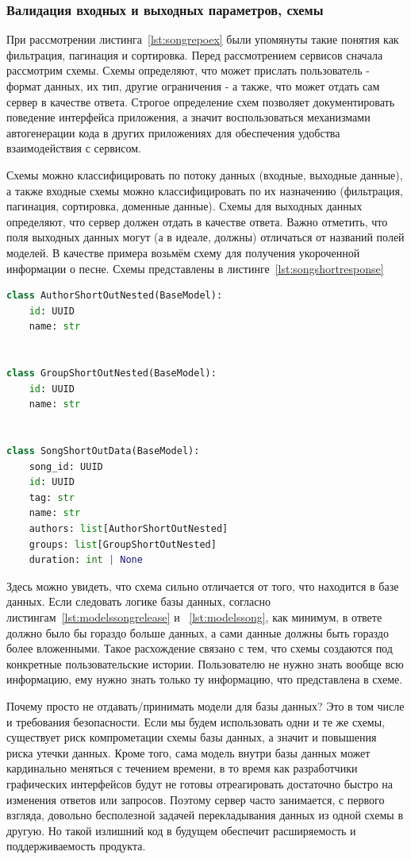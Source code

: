 \documentclass[14pt]{extarticle}
\begin{document}
\subsubsection{Валидация входных и выходных параметров, схемы}

При рассмотрении листинга~\ref{lst:songrepoex} были упомянуты такие понятия как фильтрация, пагинация и сортировка. Перед рассмотрением
сервисов сначала рассмотрим схемы. Схемы определяют, что может прислать пользователь - формат данных, их тип, другие ограничения - а также, 
что может отдать сам сервер в качестве ответа. Строгое определение схем позволяет документировать поведение интерфейса приложения, а значит 
воспользоваться механизмами автогенерации кода в других приложениях для обеспечения удобства взаимодействия с сервисом. 

Схемы можно классифицировать по потоку данных (входные, выходные данные), а также входные схемы можно классифицировать по их назначению (фильтрация, 
пагинация, сортировка, доменные данные). Схемы для выходных данных определяют, что сервер должен отдать в качестве ответа. Важно отметить, что поля выходных 
данных могут (а в идеале, должны) отличаться от названий полей моделей. В качестве примера возьмём схему для получения укороченной информации о песне. Схемы представлены
в листинге~\ref{lst:songshortresponse}
\begin{lstlisting}[caption={Схемы для получения укороченной информации о песне}, label={lst:songshortresponse}, language=Python]
class AuthorShortOutNested(BaseModel):
    id: UUID
    name: str


class GroupShortOutNested(BaseModel):
    id: UUID
    name: str


class SongShortOutData(BaseModel):
    song_id: UUID
    id: UUID
    tag: str
    name: str
    authors: list[AuthorShortOutNested]
    groups: list[GroupShortOutNested]
    duration: int | None
\end{lstlisting}

Здесь можно увидеть, что схема сильно отличается от того, что находится в базе данных. Если следовать логике базы данных, согласно листингам~\ref{lst:modelssongrelease} и ~\ref{lst:modelssong}, 
как минимум, в ответе должно было бы гораздо больше данных, а сами данные должны быть гораздо более вложенными. Такое расхождение связано с тем, что 
схемы создаются под конкретные пользовательские истории. Пользователю не нужно знать вообще всю информацию, ему нужно знать только ту информацию, что
представлена в схеме. 

Почему просто не отдавать/принимать модели для базы данных? Это в том числе и требования безопасности. Если мы будем использовать одни и те же схемы, 
существует риск компрометации схемы базы данных, а значит и повышения риска утечки данных. Кроме того, сама модель внутри базы данных может кардинально
меняться с течением времени, в то время как разработчики графических интерфейсов будут не готовы отреагировать достаточно быстро на изменения
ответов или запросов. Поэтому сервер часто занимается, с первого взгляда, довольно бесполезной задачей перекладывания данных из одной схемы
в другую. Но такой излишний код в будущем обеспечит расширяемость и поддерживаемость продукта.
\end{document}
